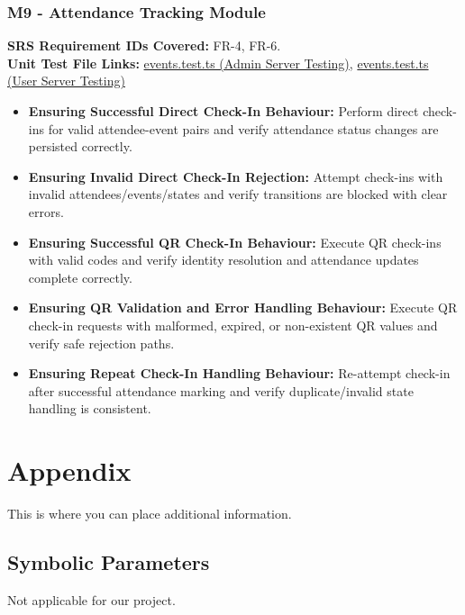 \documentclass[12pt, titlepage]{article}
\begin{document}
\subsubsection{M9 - Attendance Tracking Module}
\textbf{SRS Requirement IDs Covered:} FR-4, FR-6.
\\
\textbf{Unit Test File Links:} \href{https://github.com/VirochaanRG/MES-Event-Management-System/blob/main/test/Server%20API%20Testing/Admin%20Server%20Testing/events.test.ts}{events.test.ts (Admin Server Testing)}, \href{https://github.com/VirochaanRG/MES-Event-Management-System/blob/main/test/Server%20API%20Testing/User%20Server%20Testing/events.test.ts}{events.test.ts (User Server Testing)}
\begin{itemize}
  \item \textbf{Ensuring Successful Direct Check-In Behaviour:} Perform direct check-ins for valid attendee-event pairs and verify attendance status changes are persisted correctly.
  \item \textbf{Ensuring Invalid Direct Check-In Rejection:} Attempt check-ins with invalid attendees/events/states and verify transitions are blocked with clear errors.
  \item \textbf{Ensuring Successful QR Check-In Behaviour:} Execute QR check-ins with valid codes and verify identity resolution and attendance updates complete correctly.
  \item \textbf{Ensuring QR Validation and Error Handling Behaviour:} Execute QR check-in requests with malformed, expired, or non-existent QR values and verify safe rejection paths.
  \item \textbf{Ensuring Repeat Check-In Handling Behaviour:} Re-attempt check-in after successful attendance marking and verify duplicate/invalid state handling is consistent.
\end{itemize}




\newpage

\section{Appendix}

This is where you can place additional information.

\subsection{Symbolic Parameters}
Not applicable for our project.
\end{document}
